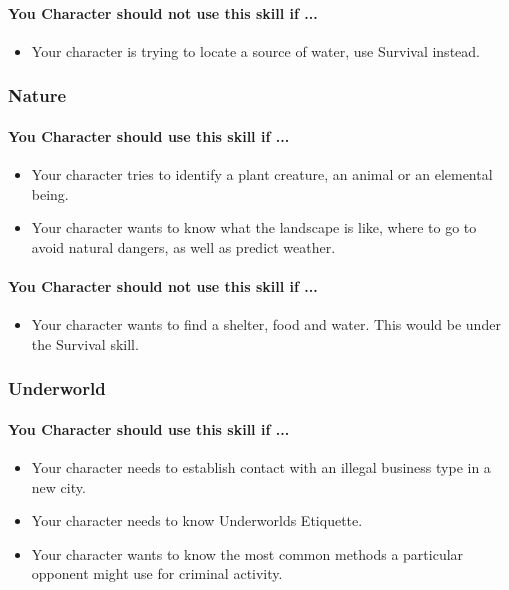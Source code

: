\begin{multicols}{2}
\paragraph{You Character should not use this skill if ...}
\begin{itemize}
    \item Your character is trying to locate a source of water, use Survival instead.
\end{itemize}

\subsubsection{Nature}\label{skill:nature}
\paragraph{You Character should use this skill if ...}
\begin{itemize}
    \item Your character tries to identify a plant creature, an animal or an
        elemental being.
    \item Your character wants to know what the landscape is like, where to go to
        avoid natural dangers, as well as predict weather.
\end{itemize}
\paragraph{You Character should not use this skill if ...}
\begin{itemize}
    \item Your character wants to find a shelter, food and water. This would be
        under the Survival skill.
\end{itemize}

\subsubsection{Underworld}\label{skill:underworld}
\paragraph{You Character should use this skill if ...}
\begin{itemize}
    \item Your character needs to establish contact with an illegal business type in a new city.
    \item Your character needs to know Underworlds Etiquette.
    \item Your character wants to know the most common methods a particular
        opponent might use for criminal activity.
\end{itemize}

\end{multicols}
